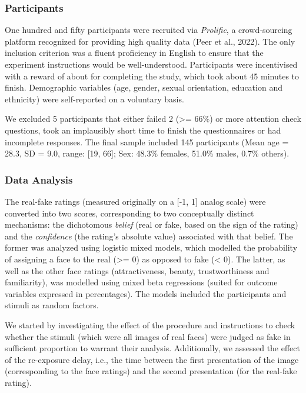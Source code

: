 \documentclass[
  man,mask,floatsintext]{apa6}
\begin{document}
\hypertarget{participants}{%
\subsubsection{Participants}\label{participants}}

One hundred and fifty participants were recruited via \emph{Prolific}, a crowd-sourcing platform recognized for providing high quality data (Peer et al., 2022). The only inclusion criterion was a fluent proficiency in English to ensure that the experiment instructions would be well-understood. Participants were incentivised with a reward of about  for completing the study, which took about 45 minutes to finish. Demographic variables (age, gender, sexual orientation, education and ethnicity) were self-reported on a voluntary basis.

We excluded 5 participants that either failed 2 (\textgreater= 66\%) or more attention check questions, took an implausibly short time to finish the questionnaires or had incomplete responses. The final sample included 145 participants (Mean age = 28.3, SD = 9.0, range: {[}19, 66{]}; Sex: 48.3\% females, 51.0\% males, 0.7\% others).

\hypertarget{data-analysis}{%
\subsubsection{Data Analysis}\label{data-analysis}}

The real-fake ratings (measured originally on a {[}-1, 1{]} analog scale) were converted into two scores, corresponding to two conceptually distinct mechanisms: the dichotomous \emph{belief} (real or fake, based on the sign of the rating) and the \emph{confidence} (the rating's absolute value) associated with that belief. The former was analyzed using logistic mixed models, which modelled the probability of assigning a face to the real (\textgreater= 0) as opposed to fake (\textless{} 0). The latter, as well as the other face ratings (attractiveness, beauty, trustworthiness and familiarity), was modelled using mixed beta regressions (suited for outcome variables expressed in percentages). The models included the participants and stimuli as random factors.

We started by investigating the effect of the procedure and instructions to check whether the stimuli (which were all images of real faces) were judged as fake in sufficient proportion to warrant their analysis. Additionally, we assessed the effect of the re-exposure delay, i.e., the time between the first presentation of the image (corresponding to the face ratings) and the second presentation (for the real-fake rating).
\end{document}
